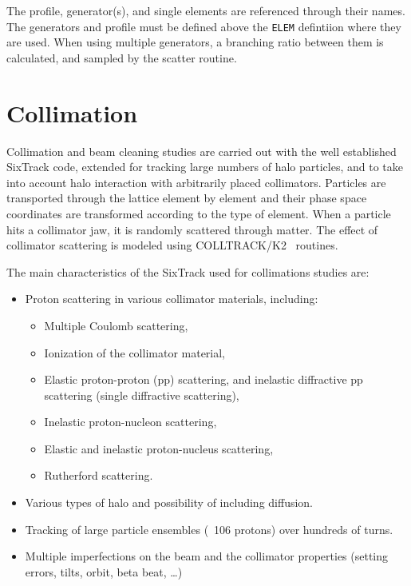 The profile, generator(s), and single elements are referenced through their names.
The generators and profile must be defined above the \texttt{ELEM} defintiion where they are used.
When using multiple generators, a branching ratio between them is calculated, and sampled by the scatter routine.

\section{Collimation} \label{sec:collimat}

Collimation and beam cleaning studies are carried out with the well established SixTrack code, extended for tracking large numbers of halo particles, and to take into account halo interaction with arbitrarily placed collimators.
Particles are transported through the lattice element by element and their phase space coordinates are transformed according to the type of element. When a particle hits a collimator jaw, it is randomly scattered through matter.
The effect of collimator scattering is modeled using COLLTRACK/K2~\cite{collimat:trenkler,collimat:robert_demolaize} routines.

\bigskip
\noindent The main characteristics of the SixTrack used for collimations studies are:
\begin{itemize}
    \item Proton scattering in various collimator materials, including:
    \begin{itemize}
        \item Multiple Coulomb scattering,
        \item Ionization of the collimator material,
        \item Elastic proton-proton (pp) scattering, and inelastic diffractive pp scattering (single diffractive scattering),
        \item Inelastic proton-nucleon scattering,
        \item Elastic and inelastic proton-nucleus scattering,
        \item Rutherford scattering.
    \end{itemize}
    \item Various types of halo and possibility of including diffusion.
    \item Tracking of large particle ensembles (~106 protons) over hundreds of turns.
    \item Multiple imperfections on the beam and the  collimator properties (setting errors, tilts, orbit, beta beat, …)
\end{itemize}


